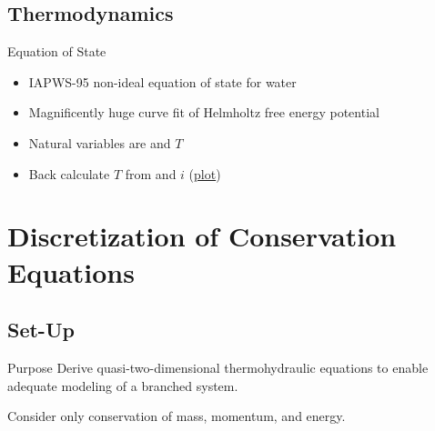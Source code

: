 \documentclass[10pt,t,xcolor=table,compress]{UWMadBeamer}
\newenvironment{Itemize}
    {\begin{itemize}\setlength{\itemsep}{0.8em}\setlength{\leftmargin}{0.0em}\setlength{\labelwidth}{0em}}
    {\end{itemize}}
\begin{document}
    \subsection*{Thermodynamics}
    \begin{frame}[label=EOS]{Equation of State}
        \begin{Itemize}
            \item{IAPWS-95 non-ideal equation of state for water}
            \item{Magnificently huge curve fit of Helmholtz free energy potential}
            \item{Natural variables are \rho{} and $T$}
            \item{Back calculate $T$ from \rho{} and $i$ (\hyperlink{irhoSpace}{plot})}
        \end{Itemize}
    \end{frame}





\section{Discretization of Conservation Equations}
    
    \subsection*{Set-Up}
    \begin{frame}{Purpose}
        Derive quasi-two-dimensional thermohydraulic equations to enable
        adequate modeling of a branched system.
        
        Consider only conservation of mass, momentum, and energy.
    \end{frame}
    

    
\end{document}
